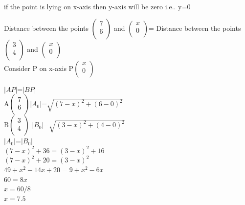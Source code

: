 \documentclass[journal,10pt,twocolumn]{article}
\begin{document}
if the point is lying on x-axis then y-axis will be zero i.e.. y=0


Distance between the points $\begin{pmatrix}
  7 \\
  6 \\
 \end{pmatrix}$ and $\begin{pmatrix}
  x \\
  0 \\
 \end{pmatrix}$= Distance between the points $\begin{pmatrix}
  3 \\
  4 \\
 \end{pmatrix}$ and $\begin{pmatrix}
  x \\
  0 \\
 \end{pmatrix}$\\ 	     

Consider P on x-axis P$\begin{pmatrix}
  x \\
  0 \\
 \end{pmatrix}$           \vspace{3mm}

	$|AP|$=$|BP|$\\   \vspace{3mm}
A$\begin{pmatrix}
  7 \\
  6 \\
 \end{pmatrix}$$|A_0|$=$\sqrt{(7-x)^2+(6-0)^2}$\\     \vspace{3mm}
B$\begin{pmatrix}
  3 \\
  4 \\
 \end{pmatrix}$ $|B_0|$=$\sqrt{(3-x)^2+(4-0)^2}$\\      \vspace{3mm}
$|A_0|$=$|B_0|$\\             \vspace{2mm}                 
$(7-x)^2+36=(3-x)^2+16$\\      \vspace{2mm}                
$(7-x)^2+20=(3-x)^2$\\           \vspace{2mm}              
$49+x^2-14x+20=9+x^2-6x$\\         \vspace{2mm}            
$60=8x$\\                            \vspace{2mm}          
$x=60/8$\\                           \vspace{2mm}          
$x=7.5$                  			
\end{document}
